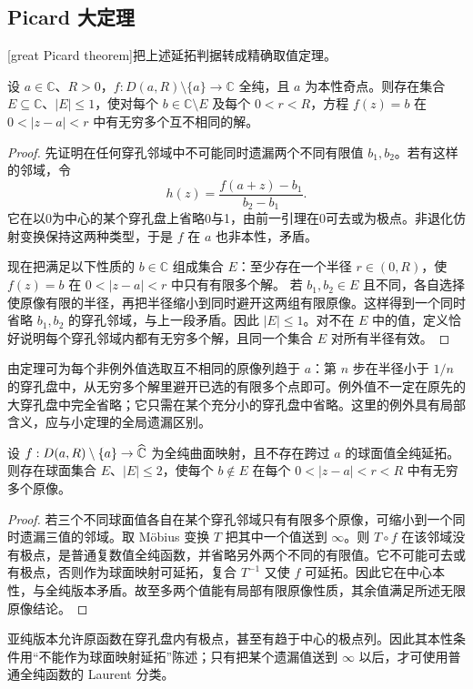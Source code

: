 \subsection{Picard 大定理}
\label{b3:subsec:140502}

[great Picard theorem]把上述延拓判据转成精确取值定理。

\begin{theorem}\label{b3:thm:14-picard-great}
设 \(a\in\mathbb C\)、\(R>0\)，\(f:D(a,R)\setminus\{a\}\to\mathbb C\) 全纯，且 \(a\) 为本性奇点。则存在集合 \(E\subseteq\mathbb C\)、\(|E|\le1\)，使对每个 \(b\in\mathbb C\setminus E\) 及每个 \(0<r<R\)，方程 \(f(z)=b\) 在 \(0<|z-a|<r\) 中有无穷多个互不相同的解。
\end{theorem}
\begin{proof}
先证明在任何穿孔邻域中不可能同时遗漏两个不同有限值 \(b_1,b_2\)。若有这样的邻域，令
\[
 h(z)=\frac{f(a+z)-b_1}{b_2-b_1}.
\]
它在以0为中心的某个穿孔盘上省略0与1，由前一引理在0可去或为极点。非退化仿射变换保持这两种类型，于是 \(f\) 在 \(a\) 也非本性，矛盾。

现在把满足以下性质的 \(b\in\mathbb C\) 组成集合 \(E\)：至少存在一个半径 \(r\in(0,R)\)，使 \(f(z)=b\) 在 \(0<|z-a|<r\) 中只有有限多个解。
若 \(b_1,b_2\in E\) 且不同，各自选择使原像有限的半径，再把半径缩小到同时避开这两组有限原像。这样得到一个同时省略 \(b_1,b_2\) 的穿孔邻域，与上一段矛盾。因此 \(|E|\le1\)。对不在 \(E\) 中的值，定义恰好说明每个穿孔邻域内都有无穷多个解，且同一个集合 \(E\) 对所有半径有效。
\end{proof}
由定理可为每个非例外值选取互不相同的原像列趋于 \(a\)：第 \(n\) 步在半径小于 \(1/n\) 的穿孔盘中，从无穷多个解里避开已选的有限多个点即可。例外值不一定在原先的大穿孔盘中完全省略；它只需在某个充分小的穿孔盘中省略。这里的例外具有局部含义，应与小定理的全局遗漏区别。

\begin{corollary}[亚纯版本]\label{b3:cor:14-meromorphic-great}
设 \(f:D(a,R)\setminus\{a\}\to\widehat{\mathbb C\kern0pt}\) 为全纯曲面映射，且不存在跨过 \(a\) 的球面值全纯延拓。则存在球面集合 \(E\)、\(|E|\le2\)，使每个 \(b\notin E\) 在每个 \(0<|z-a|<r<R\) 中有无穷多个原像。
\end{corollary}
\begin{proof}
若三个不同球面值各自在某个穿孔邻域只有有限多个原像，可缩小到一个同时遗漏三值的邻域。取 Möbius 变换 \(T\) 把其中一个值送到 \(\infty\)。则 \(T\circ f\) 在该邻域没有极点，是普通复数值全纯函数，并省略另外两个不同的有限值。它不可能可去或有极点，否则作为球面映射可延拓，复合 \(T^{-1}\) 又使 \(f\) 可延拓。因此它在中心本性，与全纯版本矛盾。故至多两个值能有局部有限原像性质，其余值满足所述无限原像结论。
\end{proof}
亚纯版本允许原函数在穿孔盘内有极点，甚至有趋于中心的极点列。因此其本性条件用“不能作为球面映射延拓”陈述；只有把某个遗漏值送到 \(\infty\) 以后，才可使用普通全纯函数的 Laurent 分类。

